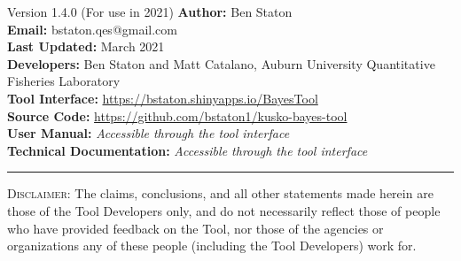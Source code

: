 \begin{bclogo}[margeG=-1.5,margeD=-1.5,logo=\hspace{17pt},couleurBarre=black, noborder=false,couleur=light-grey]{Version 1.4.0 (For use in 2021)}
   \textbf{Author:} Ben Staton \\[3pt]
   \textbf{Email:} bstaton.qes@gmail.com \\[3pt]
   \textbf{Last Updated:} March 2021 \\[3pt]
   \textbf{Developers:} Ben Staton and Matt Catalano, Auburn University Quantitative Fisheries Laboratory \\[3pt]
   \textbf{Tool Interface:} \url{https://bstaton.shinyapps.io/BayesTool} \\[3pt]
   \textbf{Source Code:} \url{https://github.com/bstaton1/kusko-bayes-tool} \\[3pt]
   \textbf{User Manual:} \textit{Accessible through the tool interface} \\[3pt]
   \textbf{Technical Documentation:} \textit{Accessible through the tool interface}
  \hrule
  \footnotesize{\textsc{Disclaimer}: The claims, conclusions, and all other statements made herein are those of the Tool Developers only, and do not necessarily reflect those of people who have provided feedback on the Tool, nor those of the agencies or organizations any of these people (including the Tool Developers) work for}.
\end{bclogo}
